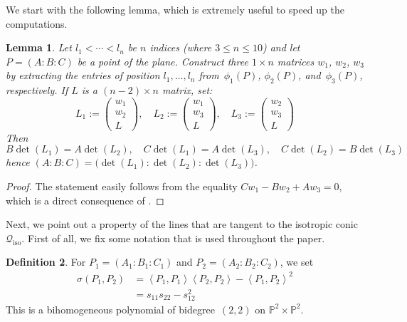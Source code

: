 \documentclass[a4paper, 11pt, reqno]{amsart}
\theoremstyle{plain}
\newtheorem{lemma}{Lemma}[section]
\theoremstyle{definition}
\newtheorem{definition}[lemma]{Definition}
\newcommand{\p}{\mathbb{P}}
\newcommand{\iso}{\mathcal{Q}_{\mathrm{iso}}}
\newcommand{\scl}[2]{\left\langle {#1}, {#2} \right\rangle}
\begin{document}
We start with the following lemma, which is extremely useful
to speed up the computations.

\begin{lemma}
\label{lemma:minors}
Let $l_1 < \cdots <l_n$ be $n$ indices (where $3 \leq n \leq 10$) and let $P = (A: B: C)$ be a point of the plane.
Construct three $1 \times n$ matrices $w_1$, $w_2$, $w_3$ by extracting the entries of position $l_1, \dotsc, l_n$ from~$\phi_1(P)$, $\phi_2(P)$, and~$\phi_3(P)$, respectively. If $L$ is a $(n-2) \times n$ matrix, set:
%
\[
  L_1 := \left( \begin{array}{c} w_1 \\ w_2 \\ L \end{array} \right), \quad
  L_2 := \left( \begin{array}{c} w_1 \\ w_3 \\ L \end{array} \right), \quad
  L_3 := \left( \begin{array}{c} w_2 \\ w_3 \\ L \end{array} \right)
\]
%
Then
%
\[
  B \det(L_1) = A \det(L_2), \quad
  C \det(L_1) = A \det(L_3), \quad
  C \det(L_2) = B \det(L_3)
\]
%
hence $(A: B: C) = \bigl( \det(L_1): \det(L_2): \det(L_3) \bigr)$.
\end{lemma}
\begin{proof}
The statement easily follows from the equality $C w_1 - B w_2 + A w_3 = 0$, which is a direct consequence of .
\end{proof}



Next, we point out a property of the lines that are tangent to the isotropic conic~$\iso$.
First of all, we fix some notation that is used throughout the paper.

\begin{definition}
\label{definition:sigma}
For $P_1 = (A_1: B_1: C_1)$ and $P_2 = (A_2: B_2: C_2)$, we set
%
\begin{equation}
\label{formula:sigma}
\begin{aligned}
  \sigma(P_1, P_2) &= \scl{P_1}{P_1} \scl{P_2}{P_2} - \scl{P_1}{P_2}^2 \\
   &= s_{11}s_{22}-s_{12}^2
\end{aligned}
\end{equation}
%
This is a bihomogeneous polynomial of bidegree~$(2,2)$ on $\p^2 \times \p^2$.
\end{definition}
\end{document}
